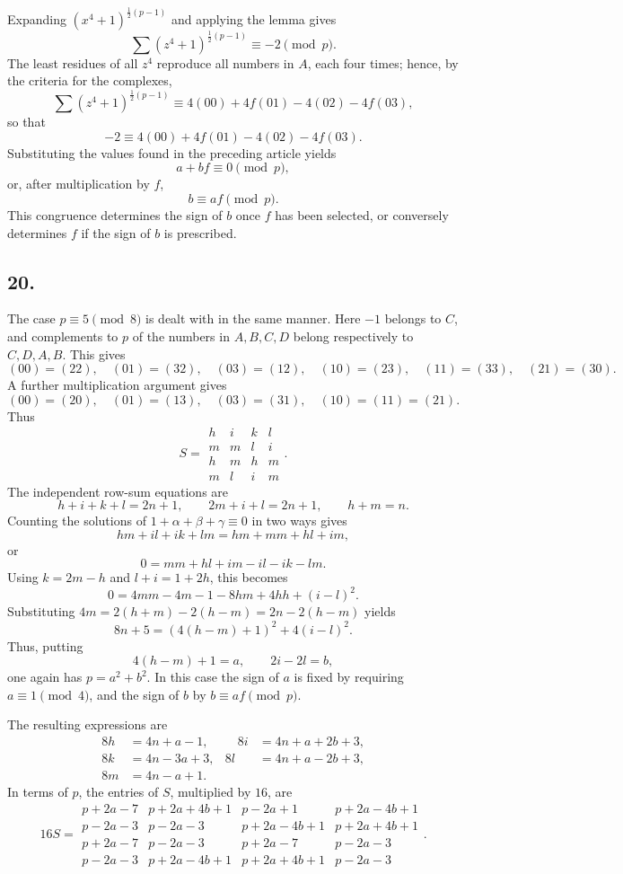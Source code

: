 \documentclass[12pt]{article}
\begin{document}
Expanding $(x^4+1)^{\frac12(p-1)}$ and applying the lemma gives
\[
\sum (z^4+1)^{\frac12(p-1)}\equiv -2 \pmod p.
\]
The least residues of all $z^4$ reproduce all numbers in $A$, each four times; hence, by the criteria for the complexes,
\[
\sum (z^4+1)^{\frac12(p-1)}
 \equiv 4(00)+4f(01)-4(02)-4f(03),
\]
so that
\[
-2\equiv4(00)+4f(01)-4(02)-4f(03).
\]
Substituting the values found in the preceding article yields
\[
a+bf\equiv0\pmod p,
\]
or, after multiplication by $f$,
\[
b\equiv af\pmod p.
\]
This congruence determines the sign of $b$ once $f$ has been selected, or conversely determines $f$ if the sign of $b$ is prescribed.

\subsection*{20.}

The case $p\equiv5\pmod8$ is dealt with in the same manner. Here $-1$ belongs to $C$, and complements to $p$ of the numbers in $A,B,C,D$ belong respectively to $C,D,A,B$. This gives
\[
(00)=(22),\quad (01)=(32),\quad (03)=(12),\quad
(10)=(23),\quad (11)=(33),\quad (21)=(30).
\]
A further multiplication argument gives
\[
(00)=(20),\quad (01)=(13),\quad (03)=(31),\quad (10)=(11)=(21).
\]
Thus
\[
S=\begin{array}{rrrr}
h&i&k&l\\
m&m&l&i\\
h&m&h&m\\
m&l&i&m
\end{array}.
\]
The independent row-sum equations are
\[
h+i+k+l=2n+1,\qquad 2m+i+l=2n+1,\qquad h+m=n.
\]
Counting the solutions of $1+\alpha+\beta+\gamma\equiv0$ in two ways gives
\[
hm+il+ik+lm=hm+mm+hl+im,
\]
or
\[
0=mm+hl+im-il-ik-lm.
\]
Using $k=2m-h$ and $l+i=1+2h$, this becomes
\[
0=4mm-4m-1-8hm+4hh+(i-l)^2.
\]
Substituting $4m=2(h+m)-2(h-m)=2n-2(h-m)$ yields
\[
8n+5=(4(h-m)+1)^2+4(i-l)^2.
\]
Thus, putting
\[
4(h-m)+1=a,\qquad 2i-2l=b,
\]
one again has $p=a^2+b^2$. In this case the sign of $a$ is fixed by requiring $a\equiv1\pmod4$, and the sign of $b$ by $b\equiv af\pmod p$.

The resulting expressions are
\[
\begin{aligned}
8h&=4n+a-1,&\quad 8i&=4n+a+2b+3,\\
8k&=4n-3a+3,& 8l&=4n+a-2b+3,\\
8m&=4n-a+1.
\end{aligned}
\]
In terms of $p$, the entries of $S$, multiplied by $16$, are
\[
16S=\begin{array}{rrrr}
p+2a-7&p+2a+4b+1&p-2a+1&p+2a-4b+1\\
p-2a-3&p-2a-3&p+2a-4b+1&p+2a+4b+1\\
p+2a-7&p-2a-3&p+2a-7&p-2a-3\\
p-2a-3&p+2a-4b+1&p+2a+4b+1&p-2a-3
\end{array}.
\]
\end{document}
